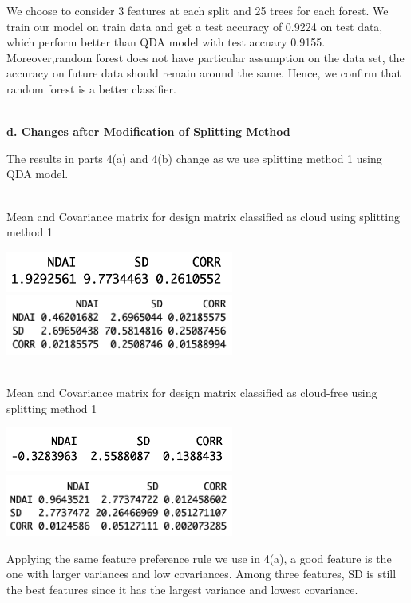 \documentclass[11pt]{article}
\begin{document}
We choose to consider 3 features at each split and 25 trees for each forest. We train our model on train data and get a test accuracy of 0.9224 on test data, which perform better than QDA model with test accuary 0.9155. Moreover,random forest does not have particular assumption on the data set, the accuracy on future data should remain around the same. Hence, we confirm that random forest is a better classifier. 

\vspace{0.3cm}
\mbox{}\\
\textbf{d. Changes after Modification of Splitting Method}

The results in parts 4(a) and 4(b) change as we use splitting method 1 using QDA model.

\mbox{}\\
Mean and Covariance matrix for design matrix classified as cloud using splitting method 1

\includegraphics[width = 7.5cm]{4(d)1}
\includegraphics[width = 7.5cm]{4(d)2}

\mbox{}\\
Mean and Covariance matrix for design matrix classified as cloud-free using splitting method 1

\includegraphics[width = 7.5cm]{4(d)3}
\includegraphics[width = 7.5cm]{4(d)4}

Applying the same feature preference rule we use in 4(a), a good feature is the one with larger variances and low covariances. Among three features, SD is still the best features since it has the largest variance and lowest covariance.
\end{document}
